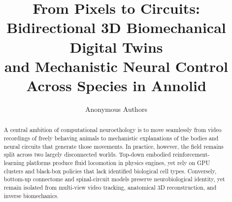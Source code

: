\documentclass[10pt,twocolumn,letterpaper]{article}
\title{\vspace{-2.0em}\Large\textbf{From Pixels to Circuits: Bidirectional 3D Biomechanical Digital Twins\\and Mechanistic Neural Control Across Species in Annolid}\vspace{-0.4em}}
\author{
  Anonymous Authors
}
\date{\vspace{-1.4em}}
\begin{document}
\raggedbottom
\maketitle
\thispagestyle{plain}

\setlength{\abovedisplayskip}{4.5pt}
\setlength{\belowdisplayskip}{4.5pt}

\begin{abstract}
\vspace{-0.3em}
A central ambition of computational neuroethology is to move seamlessly from video recordings of freely behaving animals to mechanistic explanations of the bodies and neural circuits that generate those movements. In practice, however, the field remains split across two largely disconnected worlds. Top-down embodied reinforcement-learning platforms produce fluid locomotion in physics engines, yet rely on GPU clusters and black-box policies that lack identified biological cell types. Conversely, bottom-up connectome and spinal-circuit models preserve neurobiological identity, yet remain isolated from multi-view video tracking, anatomical 3D reconstruction, and inverse biomechanics.


\end{abstract}
\end{document}
